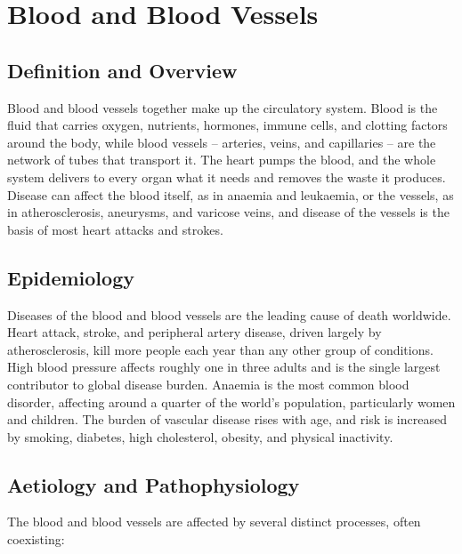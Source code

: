 \chapter{Blood and Blood Vessels}

\section*{Definition and Overview}
Blood and blood vessels together make up the circulatory system. Blood is the fluid that carries oxygen, nutrients, hormones, immune cells, and clotting factors around the body, while blood vessels -- arteries, veins, and capillaries -- are the network of tubes that transport it. The heart pumps the blood, and the whole system delivers to every organ what it needs and removes the waste it produces. Disease can affect the blood itself, as in anaemia and leukaemia, or the vessels, as in atherosclerosis, aneurysms, and varicose veins, and disease of the vessels is the basis of most heart attacks and strokes.

\section*{Epidemiology}
Diseases of the blood and blood vessels are the leading cause of death worldwide. Heart attack, stroke, and peripheral artery disease, driven largely by atherosclerosis, kill more people each year than any other group of conditions. High blood pressure affects roughly one in three adults and is the single largest contributor to global disease burden. Anaemia is the most common blood disorder, affecting around a quarter of the world's population, particularly women and children. The burden of vascular disease rises with age, and risk is increased by smoking, diabetes, high cholesterol, obesity, and physical inactivity.

\section*{Aetiology and Pathophysiology}
The blood and blood vessels are affected by several distinct processes, often coexisting:

